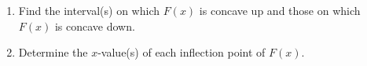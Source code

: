 \documentclass[12pt]{article}
\newif\ifans
\begin{document}
\begin{enumerate}
\begin{enumerate}
\item Find the interval(s) on which $F(x)$ is concave up and those on which $F(x)$ is concave down.

\ifans{\fbox{$F(x)$ is concave down on $\left(0,\frac{1}{e}\right)$ and is concave up on $\left(\frac{1}{e},\infty\right)$}} \fi

\item Determine the $x$-value(s) of each inflection point of $F(x)$.

\ifans{\fbox{$F(x)$ has an inflection point when $x=\frac{1}{e}$}} \fi

\end{enumerate}

\end{enumerate}
\end{document}
